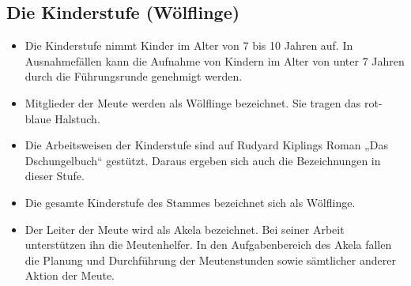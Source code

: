 \documentclass[a4paper]{article}
\begin{document}
    \subsection{Die Kinderstufe (Wölflinge)}
		\begin{itemize}
			\item Die Kinderstufe nimmt Kinder im Alter von 7 bis 10 Jahren auf. In Ausnahmefällen kann die Aufnahme von Kindern im Alter von unter 7 Jahren durch die Führungsrunde genehmigt werden. 
            \item Mitglieder der Meute werden als Wölflinge bezeichnet. Sie tragen das rot-blaue Halstuch.
			\item Die Arbeitsweisen der Kinderstufe sind auf Rudyard Kiplings Roman „Das Dschungelbuch“ gestützt. Daraus ergeben sich auch die Bezeichnungen in dieser Stufe. 
			\item Die gesamte Kinderstufe des Stammes bezeichnet sich als Wölflinge.
			\item Der Leiter der Meute wird als Akela bezeichnet. Bei seiner Arbeit unterstützen ihn die Meutenhelfer. In den Aufgabenbereich des Akela fallen die Planung und Durchführung der Meutenstunden sowie sämtlicher anderer Aktion der Meute. 
		\end{itemize}
\end{document}
